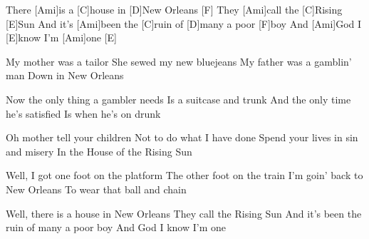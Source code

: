 
\sloka
There [Ami]is a [C]house in [D]New Orleans [F]
They [Ami]call the [C]Rising [E]Sun
And it’s [Ami]been the [C]ruin of [D]many a poor [F]boy
And [Ami]God I [E]know I’m [Ami]one [E]

\sloka
My mother was a tailor
She sewed my new bluejeans
My father was a gamblin’ man
Down in New Orleans

\sloka
Now the only thing a gambler needs
Is a suitcase and trunk
And the only time he’s satisfied
Is when he’s on drunk

\sloka
Oh mother tell your children
Not to do what I have done
Spend your lives in sin and misery
In the House of the Rising Sun

\sloka
Well, I got one foot on the platform
The other foot on the train
I’m goin’ back to New Orleans
To wear that ball and chain

\sloka
Well, there is a house in New Orleans
They call the Rising Sun
And it’s been the ruin of many a poor boy
And God I know I’m one
